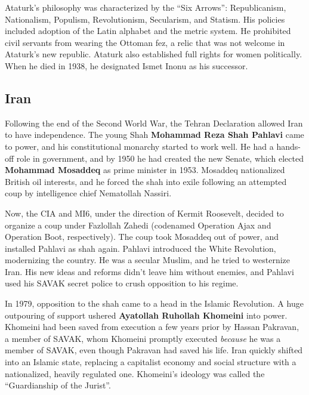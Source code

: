 Ataturk's philosophy was characterized by the ``Six Arrows'':
Republicanism, Nationalism, Populism, Revolutionism, Secularism, and Statism.
His policies included adoption of the Latin alphabet and the metric system.
He prohibited civil servants from wearing the Ottoman fez, a relic that was not welcome in Ataturk's new republic.
Ataturk also established full rights for women politically.
When he died in 1938, he designated Ismet Inonu as his successor.

\subsection*{Iran}

Following the end of the Second World War, the Tehran Declaration allowed Iran to have independence.
The young Shah \textbf{Mohammad Reza Shah Pahlavi} came to power,
and his constitutional monarchy started to work well.
He had a hands-off role in government, and by 1950 he had created the new Senate,
which elected \textbf{Mohammad Mosaddeq} as prime minister in 1953.
Mosaddeq nationalized British oil interests,
and he forced the shah into exile following an attempted coup by intelligence chief Nematollah Nassiri.

Now, the CIA and MI6, under the direction of Kermit Roosevelt, decided to organize a coup under Fazlollah Zahedi
(codenamed Operation Ajax and Operation Boot, respectively).
The coup took Mosaddeq out of power, and installed Pahlavi as shah again.
Pahlavi introduced the White Revolution, modernizing the country.
He was a secular Muslim, and he tried to westernize Iran.
His new ideas and reforms didn't leave him without enemies,
and Pahlavi used his SAVAK secret police to crush opposition to his regime.

In 1979, opposition to the shah came to a head in the Islamic Revolution.
A huge outpouring of support ushered \textbf{Ayatollah Ruhollah Khomeini} into power.
Khomeini had been saved from execution a few years prior by Hassan Pakravan,
a member of SAVAK, whom Khomeini promptly executed \textit{because} he was a member of SAVAK,
even though Pakravan had saved his life.
Iran quickly shifted into an Islamic state,
replacing a capitalist economy and social structure with a nationalized, heavily regulated one.
Khomeini's ideology was called the ``Guardianship of the Jurist''.

